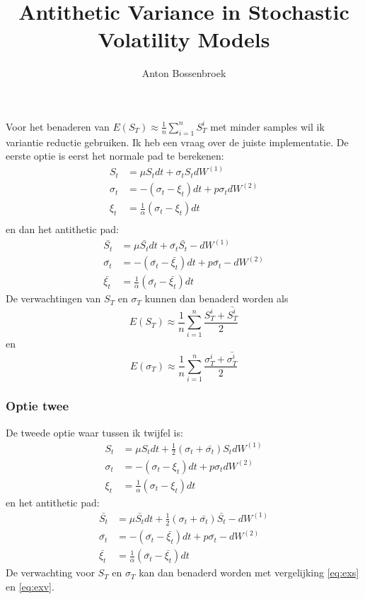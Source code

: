\documentclass[a4paper]{article}
\author{Anton Bossenbroek}
\title{Antithetic Variance in Stochastic Volatility Models}
\begin{document}
\maketitle
Voor het benaderen van $E(S_T) \approx \frac{1}{n}\sum_{i = 1}^{n} S_T^i$ met minder samples
wil ik variantie reductie gebruiken. Ik heb een vraag over de juiste
implementatie. De eerste optie is eerst het normale pad te berekenen:
\begin{align*}
S_t &= \mu S_t dt + \sigma_t S_t dW^{(1)}\\
\sigma_t &= -(\sigma_t - \xi_t) dt + p\sigma_t dW^{(2)}\\
\xi_t &= \frac{1}{\alpha}(\sigma_t - \xi_t)dt\\
\end{align*}
en dan het antithetic pad:
\begin{align*}
\bar{S_t} &= \mu \bar{S_t} dt + \bar{\sigma_t} \bar{S_t} -dW^{(1)}\\
\bar{\sigma_t} &= -(\bar{\sigma_t} - \bar{\xi_t}) dt + p\bar{\sigma_t
}-dW^{(2)}\\
\bar{\xi_t} &= \frac{1}{\alpha}(\bar{\sigma_t} - \bar{\xi_t})dt
\end{align*}
De verwachtingen van $S_T$ en $\sigma_T$ kunnen dan benaderd worden als
\begin{equation}\label{eq:exs}
E(S_T) \approx \frac{1}{n} \sum_{i = 1}^{n} \frac{S^i_T + \bar{S^i_T}}{2}
\end{equation}
en
\begin{equation}\label{eq:exv}
E(\sigma_T) \approx \frac{1}{n} \sum_{i = 1}^{n} \frac{\sigma^i_T +
\bar{\sigma^i_T}}{2}
\end{equation}

\subsubsection*{Optie twee}
De tweede optie waar tussen ik twijfel is:
\begin{align*}
S_t &= \mu S_t dt + \frac{1}{2}(\sigma_t + \bar{\sigma_t}) S_t dW^{(1)}\\
\sigma_t &= -(\sigma_t - \xi_t) dt + p\sigma_t dW^{(2)}\\
\xi_t &= \frac{1}{\alpha}(\sigma_t - \xi_t)dt
\end{align*}
en het antithetic pad:
\begin{align*}
\bar{S_t} &= \mu \bar{S_t} dt + \frac{1}{2}(\sigma_t + \bar{\sigma_t})
\bar{S_t} -dW^{(1)}\\
\bar{\sigma_t} &= -(\bar{\sigma_t} - \bar{\xi_t}) dt + p\bar{\sigma_t
}-dW^{(2)}\\
\bar{\xi_t} &= \frac{1}{\alpha}(\bar{\sigma_t} - \bar{\xi_t})dt
\end{align*}
De verwachting voor $S_T$ en $\sigma_T$ kan dan benaderd worden met
vergelijking \eqref{eq:exs} en \eqref{eq:exv}.
\end{document}
